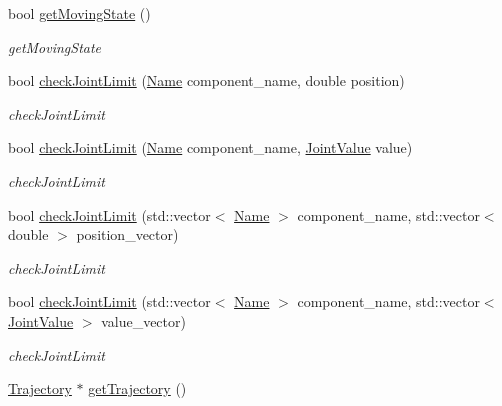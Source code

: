 \begin{DoxyCompactItemize}
bool \hyperlink{classrobotis__manipulator_1_1_robotis_manipulator_afa3c8994013b876eb38f22b4128f147a}{get\+Moving\+State} ()
\begin{DoxyCompactList}\small\item\em get\+Moving\+State \end{DoxyCompactList}\item 
bool \hyperlink{classrobotis__manipulator_1_1_robotis_manipulator_a37a3225fe662919d78e32b860e64e61a}{check\+Joint\+Limit} (\hyperlink{namespacerobotis__manipulator_a08c2d25e77a01ad75b9bb740f8ce4765}{Name} component\+\_\+name, double position)
\begin{DoxyCompactList}\small\item\em check\+Joint\+Limit \end{DoxyCompactList}\item 
bool \hyperlink{classrobotis__manipulator_1_1_robotis_manipulator_a58889d7ad25c86c1b7e1a17d07fbc45d}{check\+Joint\+Limit} (\hyperlink{namespacerobotis__manipulator_a08c2d25e77a01ad75b9bb740f8ce4765}{Name} component\+\_\+name, \hyperlink{namespacerobotis__manipulator_aa0556c98c5294ccf3a96c2d0fe315e40}{Joint\+Value} value)
\begin{DoxyCompactList}\small\item\em check\+Joint\+Limit \end{DoxyCompactList}\item 
bool \hyperlink{classrobotis__manipulator_1_1_robotis_manipulator_a552fd021bf33ae2f21ffdd18bb104fb5}{check\+Joint\+Limit} (std\+::vector$<$ \hyperlink{namespacerobotis__manipulator_a08c2d25e77a01ad75b9bb740f8ce4765}{Name} $>$ component\+\_\+name, std\+::vector$<$ double $>$ position\+\_\+vector)
\begin{DoxyCompactList}\small\item\em check\+Joint\+Limit \end{DoxyCompactList}\item 
bool \hyperlink{classrobotis__manipulator_1_1_robotis_manipulator_a000f46b185190fc13e236546ea8a11fc}{check\+Joint\+Limit} (std\+::vector$<$ \hyperlink{namespacerobotis__manipulator_a08c2d25e77a01ad75b9bb740f8ce4765}{Name} $>$ component\+\_\+name, std\+::vector$<$ \hyperlink{namespacerobotis__manipulator_aa0556c98c5294ccf3a96c2d0fe315e40}{Joint\+Value} $>$ value\+\_\+vector)
\begin{DoxyCompactList}\small\item\em check\+Joint\+Limit \end{DoxyCompactList}\item 
\hyperlink{classrobotis__manipulator_1_1_trajectory}{Trajectory} $\ast$ \hyperlink{classrobotis__manipulator_1_1_robotis_manipulator_a4d6490b231d78e0c7af7de6fd3618c9f}{get\+Trajectory} ()

\end{DoxyCompactItemize}
